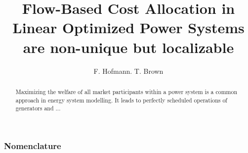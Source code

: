 \documentclass[11pt,twocolumn]{article}
\begin{document}
\title{Flow-Based Cost Allocation in Linear Optimized Power Systems are non-unique but localizable}
\author{F. Hofmann. T. Brown}

\maketitle

\begin{abstract}
Maximizing the welfare of all market participants within a power system is a common approach in energy system modelling. It leads to perfectly scheduled operations of generators and ... 
\end{abstract}






\subsubsection*{Nomenclature}
\end{document}
